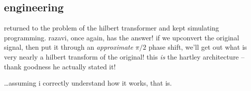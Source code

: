 \subsection*{engineering}
returned to the problem of the hilbert transformer and kept simulating \amp
programming. razavi, once again, has the answer! if we upconvert the original
signal, then put it through an \emph{approximate} \(\pi/2\) phase shift, we'll
get out what is very nearly a hilbert transform of the original! this \emph{is}
the hartley architecture -- thank goodness he actually stated it!

\ldots assuming i correctly understand how it works, that is.
